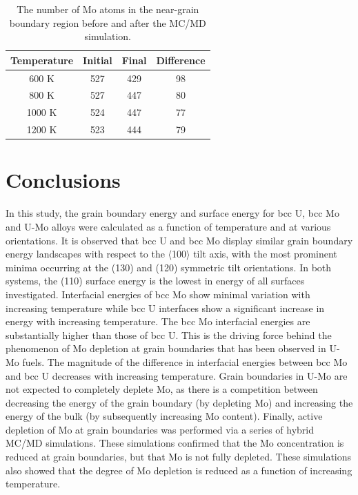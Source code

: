 \documentclass[review]{elsarticle}
\begin{document}
\begin{table}[h]
\caption{The number of Mo atoms in the near-grain boundary region before and after the MC/MD simulation. } \label{tab:mcmdtemp}
\begin{center}
\begin{tabular}{|c|c|c|c|}
	\hline
Temperature & Initial & Final & Difference \\
\hline
600 K & 527 & 429 & 98 \\
800 K & 527 & 447 & 80\\ 
1000 K & 524 & 447 & 77 \\
1200 K & 523 & 444 & 79 \\
 	 \hline
\end{tabular}
\end{center}
\label{default}
\end{table}

\FloatBarrier

\section{Conclusions}

In this study, the grain boundary energy and surface energy for bcc U, bcc Mo and U-Mo alloys were calculated as a function of temperature and at various orientations. It is observed that bcc U and bcc Mo display similar grain boundary energy landscapes with respect to the $\langle$100$\rangle$ tilt axis, with the most prominent minima occurring at the (130) and (120) symmetric tilt orientations. In both systems, the (110) surface energy is the lowest in energy of all surfaces investigated. Interfacial energies of bcc Mo show minimal variation with increasing temperature while bcc U interfaces show a significant increase in energy with increasing temperature. The bcc Mo interfacial energies are substantially higher than those of bcc U. This is the driving force behind the phenomenon of Mo depletion at grain boundaries that has been observed in U-Mo fuels. The magnitude of the difference in interfacial energies between bcc Mo and bcc U decreases with increasing temperature. Grain boundaries in U-Mo are not expected to completely deplete Mo, as there is a competition between decreasing the energy of the grain boundary (by depleting Mo) and increasing the energy of the bulk (by subsequently increasing Mo content). Finally, active depletion of Mo at grain boundaries was performed via a series of hybrid MC/MD simulations. These simulations confirmed that the Mo concentration is reduced at grain boundaries, but that Mo is not fully depleted. These simulations also showed that the degree of Mo depletion is reduced as a function of increasing temperature. 
\end{document}
